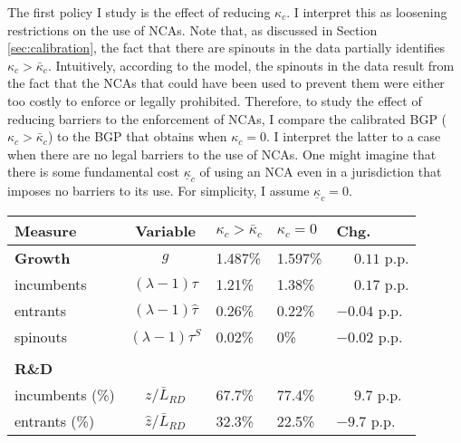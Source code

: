 \documentclass[11pt,english]{article}
\theoremstyle{definition}
\begin{document}
The first policy I study is the effect of reducing $\kappa_c$. I interpret this as loosening restrictions on the use of NCAs. Note that, as discussed in Section \ref{sec:calibration}, the fact that there are spinouts in the data partially identifies $\kappa_c > \bar{\kappa}_c$. Intuitively, according to the model, the spinouts in the data result from the fact that the NCAs that could have been used to prevent them were either too costly to enforce or legally prohibited. Therefore, to study the effect of reducing barriers to the enforcement of NCAs, I compare the calibrated BGP ($\kappa_c > \bar{\kappa}_c$) to the BGP that obtains when $\kappa_c = 0$. I interpret the latter to a case when there are no legal barriers to the use of NCAs. One might imagine that there is some fundamental cost $\underline{\kappa}_c$ of using an NCA even in a jurisdiction that imposes no barriers to its use. For simplicity, I assume $\underline{\kappa}_c = 0$. 

\begin{table}
	\centering
	\label{reducing_kappa_c_decomposition_table}
	\begin{tabular}{lclll}
		\toprule \toprule
		Measure & Variable & $\kappa_c > \bar{\kappa}_c$ & $\kappa_c = 0$ & Chg. \tabularnewline
		\midrule
		\textbf{Growth} & $g$ & 1.487\% & 1.597\% & $\phantom{-} 0.11$ p.p.\tabularnewline
		\multicolumn{1}{l}{\quad incumbents} & $(\lambda -1) \tau$  & 1.21\% & 1.38\% & $\phantom{-}0.17$ p.p. \tabularnewline
		\multicolumn{1}{l}{\quad entrants} & $(\lambda -1) \hat{\tau}$ & 0.26\% & 0.22\% & $-0.04$ p.p. \tabularnewline
		\multicolumn{1}{l}{\quad spinouts} & $(\lambda -1) \tau^S$ & 0.02\% & 0\% & $-0.02$ p.p. \tabularnewline
		\tabularnewline
		\textbf{R\&D} & & & & 
		\tabularnewline
		\multicolumn{1}{l}{\quad incumbents (\%)}  & $z / \bar{L}_{RD}$ & 67.7\% & 77.4\% & $\phantom{-} 9.7$ p.p. \tabularnewline 
		
		\multicolumn{1}{l}{\quad entrants (\%)}  & $\hat{z} / \bar{L}_{RD}$ & 32.3\% & 22.5\% & $-9.7$ p.p. \tabularnewline
		\bottomrule
	\end{tabular}
\end{table}
\end{document}
